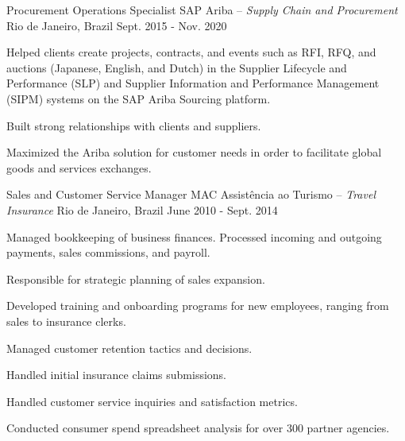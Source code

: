 


\begin{cventries}


\cventry
{Procurement Operations Specialist} %
{SAP Ariba \textmd{-- \em{Supply Chain and Procurement}}} %
{Rio de Janeiro, Brazil} %
{Sept. 2015 - Nov. 2020} %
{ %
\begin{cvitems}
\item {Helped clients create projects, contracts, and events such as RFI, RFQ, and auctions (Japanese, English, and Dutch)
in the Supplier Lifecycle and Performance (SLP) and Supplier Information and Performance Management (SIPM)
systems on the SAP Ariba Sourcing platform.}
\item {Built strong relationships with clients and suppliers.}
\item {Maximized the Ariba solution for customer needs in order to facilitate global goods and services exchanges.}
\end{cvitems}
}


\cventry
{Sales and Customer Service Manager} %
{MAC Assistência ao Turismo \textmd{-- \em{Travel Insurance}}} %
{Rio de Janeiro, Brazil} %
{June 2010 - Sept. 2014} %
{ %
\begin{cvitems}
\item {Managed bookkeeping of business finances. Processed incoming and outgoing payments, sales commissions, and payroll.}
\item {Responsible for strategic planning of sales expansion.}
\item {Developed training and onboarding programs for new employees, ranging from sales to insurance clerks.}
\item {Managed customer retention tactics and decisions.}
\item {Handled initial insurance claims submissions.}
\item {Handled customer service inquiries and satisfaction metrics.}
\item {Conducted consumer spend spreadsheet analysis for over 300 partner agencies.}
\end{cvitems}
}


\end{cventries}
